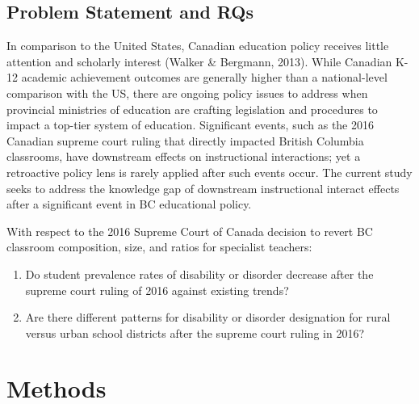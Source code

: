 \documentclass[
  english,
  man]{apa6}
\begin{document}
\hypertarget{problem-statement-and-rqs}{%
\subsection{Problem Statement and RQs}\label{problem-statement-and-rqs}}

In comparison to the United States, Canadian education policy receives little attention and scholarly interest (Walker \& Bergmann, 2013). While Canadian K-12 academic achievement outcomes are generally higher than a national-level comparison with the US, there are ongoing policy issues to address when provincial ministries of education are crafting legislation and procedures to impact a top-tier system of education. Significant events, such as the 2016 Canadian supreme court ruling that directly impacted British Columbia classrooms, have downstream effects on instructional interactions; yet a retroactive policy lens is rarely applied after such events occur. The current study seeks to address the knowledge gap of downstream instructional interact effects after a significant event in BC educational policy.

With respect to the 2016 Supreme Court of Canada decision to revert BC classroom composition, size, and ratios for specialist teachers:

\begin{enumerate}
  \item Do student prevalence rates of disability or disorder decrease after the supreme court ruling of 2016 against existing trends?
  \item Are there different patterns for disability or disorder designation for rural versus urban school districts after the supreme court ruling in 2016?
 \end{enumerate}

\hypertarget{methods}{%
\section{Methods}\label{methods}}
\end{document}
